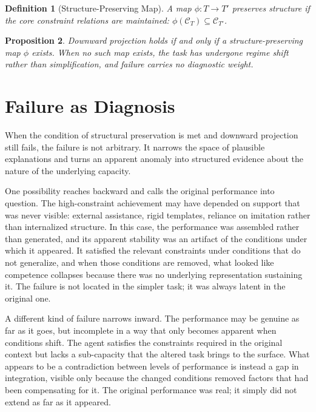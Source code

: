 \documentclass[12pt, a4paper]{article}
\newtheorem{definition}{Definition}[section]
\newtheorem{proposition}[definition]{Proposition}
\begin{document}
\begin{definition}[Structure-Preserving Map]
A map $\phi: T \to T'$ preserves structure if the core constraint relations are maintained: $\phi(\mathcal{C}_T) \subseteq \mathcal{C}_{T'}$.
\end{definition}

\begin{proposition}
Downward projection holds if and only if a structure-preserving map $\phi$ exists. When no such map exists, the task has undergone regime shift rather than simplification, and failure carries no diagnostic weight.
\end{proposition}


\section{Failure as Diagnosis}

When the condition of structural preservation is met and downward projection still fails, the failure is not arbitrary. It narrows the space of plausible explanations and turns an apparent anomaly into structured evidence about the nature of the underlying capacity.

One possibility reaches backward and calls the original performance into question. The high-constraint achievement may have depended on support that was never visible: external assistance, rigid templates, reliance on imitation rather than internalized structure. In this case, the performance was assembled rather than generated, and its apparent stability was an artifact of the conditions under which it appeared. It satisfied the relevant constraints under conditions that do not generalize, and when those conditions are removed, what looked like competence collapses because there was no underlying representation sustaining it. The failure is not located in the simpler task; it was always latent in the original one.

A different kind of failure narrows inward. The performance may be genuine as far as it goes, but incomplete in a way that only becomes apparent when conditions shift. The agent satisfies the constraints required in the original context but lacks a sub-capacity that the altered task brings to the surface. What appears to be a contradiction between levels of performance is instead a gap in integration, visible only because the changed conditions removed factors that had been compensating for it. The original performance was real; it simply did not extend as far as it appeared.
\end{document}
